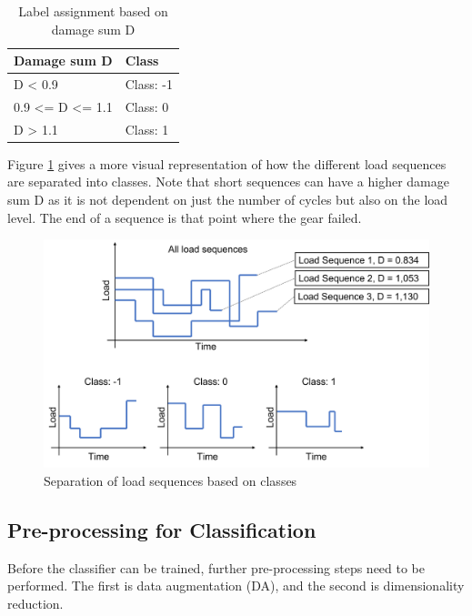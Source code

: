 \begin{table}
	\begin{center}
		\begin{tabular}{|| l | l ||}
			\hline
			\rule{0pt}{2ex}Damage sum D & Class\\
			\hline
			\hline
			\rule{0pt}{2ex}D < 0.9 & Class: -1\\\hline
			0.9 <= D <= 1.1 & Class:  0\\	\hline
			D > 1.1 & Class:  1\\\hline
			\hline
		\end{tabular}
		\caption{Label assignment based on damage sum D}
		\label{DamageClass}
	\end{center}
	\vspace{-4mm}
\end{table}

\newpage
Figure \ref{fig:SBC1} gives a more visual representation of how the different load sequences are separated into classes. Note that short sequences can have a higher damage sum D as it is not dependent on just the number of cycles but also on the load level. The end of a sequence is that point where the gear failed. 

\begin{figure}[H]
	\centering
	\includegraphics[width=0.9\linewidth]{IMGs/SBC1.png}
	\caption{Separation of load sequences based on classes}
	\label{fig:SBC1}
\end{figure}

\subsection{Pre-processing for Classification}\label{prep_class}
Before the classifier can be trained, further pre-processing steps need to be performed. The first is data augmentation (DA), and the second is dimensionality reduction. 

